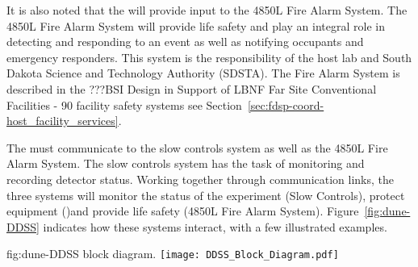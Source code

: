 It is also noted that the  will provide input to the 4850L Fire Alarm System.  The 4850L Fire Alarm System will provide life safety and play an integral role in detecting and responding to an event as well as notifying occupants and emergency responders.  This system is the responsibility of the host lab and South Dakota Science and Technology Authority (SDSTA).  The Fire Alarm System is described in the ???BSI Design in Support of LBNF Far Site Conventional Facilities - 90%
facility safety systems see Section~\ref{sec:fdsp-coord-host_facility_services}.
 
The  must communicate to the  slow controls system as well as the 4850L Fire Alarm System.  The  slow controls system has the task of monitoring and recording detector status.  Working together through communication links, the three systems will monitor the status of the experiment (Slow Controls), protect equipment ()and provide life safety (4850L Fire Alarm System). Figure~\ref{fig:dune-DDSS} indicates how these systems interact, with a few illustrated examples. 
\begin{dunefigure}{fig:dune-DDSS}
  { block diagram.}
  \texttt{[image: DDSS\_Block\_Diagram.pdf]}
\end{dunefigure}


